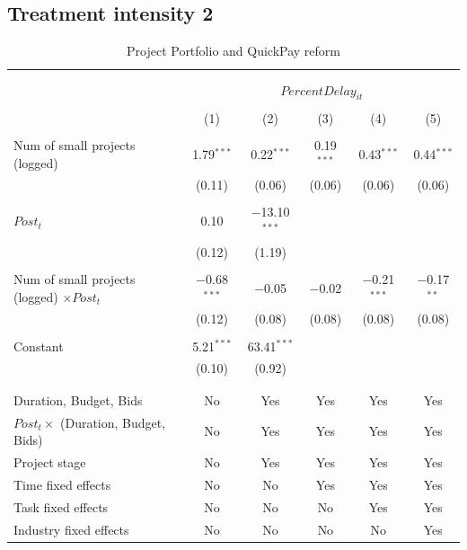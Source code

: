 \documentclass[
]{article}
\begin{document}
\hypertarget{treatment-intensity-2}{%
\subsection{Treatment intensity 2}\label{treatment-intensity-2}}

\begin{table}[H] \centering 
  \caption{Project Portfolio and QuickPay reform} 
  \label{} 
\small 
\begin{tabular}{@{\extracolsep{-10pt}}lccccc} 
\\[-1.8ex]\hline 
\hline \\[-1.8ex] 
\\[-1.8ex] & \multicolumn{5}{c}{$PercentDelay_{it}$} \\ 
\\[-1.8ex] & (1) & (2) & (3) & (4) & (5)\\ 
\hline \\[-1.8ex] 
 Num of small projects (logged) & 1.79$^{***}$ & 0.22$^{***}$ & 0.19$^{***}$ & 0.43$^{***}$ & 0.44$^{***}$ \\ 
  & (0.11) & (0.06) & (0.06) & (0.06) & (0.06) \\ 
  & & & & & \\ 
 $Post_t$ & 0.10 & $-$13.10$^{***}$ &  &  &  \\ 
  & (0.12) & (1.19) &  &  &  \\ 
  & & & & & \\ 
 Num of small projects (logged) $\times Post_t$ & $-$0.68$^{***}$ & $-$0.05 & $-$0.02 & $-$0.21$^{***}$ & $-$0.17$^{**}$ \\ 
  & (0.12) & (0.08) & (0.08) & (0.08) & (0.08) \\ 
  & & & & & \\ 
 Constant & 5.21$^{***}$ & 63.41$^{***}$ &  &  &  \\ 
  & (0.10) & (0.92) &  &  &  \\ 
  & & & & & \\ 
\hline \\[-1.8ex] 
Duration, Budget, Bids & No & Yes & Yes & Yes & Yes \\ 
$Post_t \times $  (Duration, Budget, Bids) & No & Yes & Yes & Yes & Yes \\ 
Project stage & No & Yes & Yes & Yes & Yes \\ 
Time fixed effects & No & No & Yes & Yes & Yes \\ 
Task fixed effects & No & No & No & Yes & Yes \\ 
Industry fixed effects & No & No & No & No & Yes \\ 

\end{tabular}
\end{table}
\end{document}
